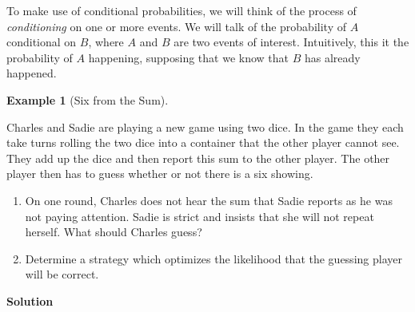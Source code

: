 \documentclass[
  letterpaper,
  DIV=11,
  numbers=noendperiod]{scrreprt}
\providecommand{\tightlist}{%
  \setlength{\itemsep}{0pt}\setlength{\parskip}{0pt}}\usepackage{longtable,booktabs,array}
\theoremstyle{definition}
\theoremstyle{definition}
\newtheorem{example}{Example}[chapter]
\theoremstyle{definition}
\theoremstyle{remark}
\begin{document}
To make use of conditional probabilities, we will think of the process
of \emph{conditioning} on one or more events. We will talk of the
probability of \(A\) conditional on \(B\), where \(A\) and \(B\) are two
events of interest. Intuitively, this it the probability of \(A\)
happening, supposing that we know that \(B\) has already happened.

\begin{example}[Six from the
Sum]\protect\hypertarget{exm-basic-conditional-probability}{}\label{exm-basic-conditional-probability}

Charles and Sadie are playing a new game using two dice. In the game
they each take turns rolling the two dice into a container that the
other player cannot see. They add up the dice and then report this sum
to the other player. The other player then has to guess whether or not
there is a six showing.

\begin{enumerate}
\def\labelenumi{\alph{enumi}.}
\tightlist
\item
  On one round, Charles does not hear the sum that Sadie reports as he
  was not paying attention. Sadie is strict and insists that she will
  not repeat herself. What should Charles guess?
\item
  Determine a strategy which optimizes the likelihood that the guessing
  player will be correct.
\end{enumerate}

\begin{tcolorbox}[enhanced jigsaw, colback=white, colframe=quarto-callout-color-frame, arc=.35mm, leftrule=.75mm, rightrule=.15mm, opacityback=0, breakable, bottomrule=.15mm, left=2mm, toprule=.15mm]

\vspace{-3mm}\textbf{Solution}\vspace{3mm}


\end{tcolorbox}
\end{example}
\end{document}
